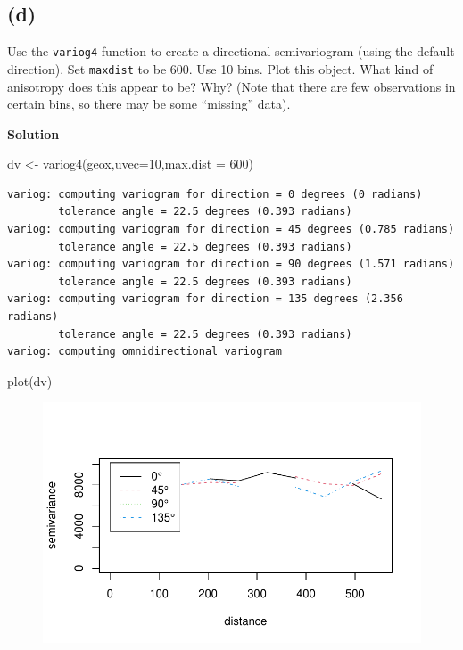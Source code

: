 \documentclass[
  letterpaper,
  DIV=11,
  numbers=noendperiod]{scrartcl}
\newenvironment{Shaded}{\begin{snugshade}}{\end{snugshade}}
\newcommand{\AttributeTok}[1]{\textcolor[rgb]{0.40,0.45,0.13}{#1}}
\newcommand{\DecValTok}[1]{\textcolor[rgb]{0.68,0.00,0.00}{#1}}
\newcommand{\FunctionTok}[1]{\textcolor[rgb]{0.28,0.35,0.67}{#1}}
\newcommand{\NormalTok}[1]{\textcolor[rgb]{0.00,0.23,0.31}{#1}}
\newcommand{\OtherTok}[1]{\textcolor[rgb]{0.00,0.23,0.31}{#1}}
\begin{document}
\hypertarget{d}{%
\subsection{(d)}\label{d}}

Use the \texttt{variog4} function to create a directional semivariogram
(using the default direction). Set \texttt{maxdist} to be 600. Use 10
bins. Plot this object. What kind of anisotropy does this appear to be?
Why? (Note that there are few observations in certain bins, so there may
be some ``missing'' data).

\textbf{Solution}

\begin{Shaded}
\begin{Highlighting}[]
\NormalTok{dv }\OtherTok{\textless{}{-}} \FunctionTok{variog4}\NormalTok{(geox,}\AttributeTok{uvec=}\DecValTok{10}\NormalTok{,}\AttributeTok{max.dist =} \DecValTok{600}\NormalTok{)}
\end{Highlighting}
\end{Shaded}

\begin{verbatim}
variog: computing variogram for direction = 0 degrees (0 radians)
        tolerance angle = 22.5 degrees (0.393 radians)
variog: computing variogram for direction = 45 degrees (0.785 radians)
        tolerance angle = 22.5 degrees (0.393 radians)
variog: computing variogram for direction = 90 degrees (1.571 radians)
        tolerance angle = 22.5 degrees (0.393 radians)
variog: computing variogram for direction = 135 degrees (2.356 radians)
        tolerance angle = 22.5 degrees (0.393 radians)
variog: computing omnidirectional variogram
\end{verbatim}

\begin{Shaded}
\begin{Highlighting}[]
\FunctionTok{plot}\NormalTok{(dv)}
\end{Highlighting}
\end{Shaded}

\begin{figure}[H]

{\centering \includegraphics{geo-hw-spdep_files/figure-pdf/unnamed-chunk-9-1.pdf}

}

\end{figure}
\end{document}
